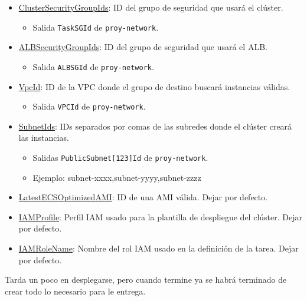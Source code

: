 \begin{itemize}
    \item \underline{ClusterSecurityGroupIds}: ID del grupo de seguridad que usará el clúster.
    \begin{itemize}
        \item Salida \texttt{TaskSGId} de \texttt{proy-network}.
    \end{itemize}

    \item \underline{ALBSecurityGroupIds}: ID del grupo de seguridad que usará el ALB.
    \begin{itemize}
        \item Salida \texttt{ALBSGId} de \texttt{proy-network}.
    \end{itemize}

    \item \underline{VpcId}: ID de la VPC donde el grupo de destino buscará instancias válidas.
    \begin{itemize}
        \item Salida \texttt{VPCId} de \texttt{proy-network}.
    \end{itemize}

    \item \underline{SubnetIds}: IDs separados por comas de las subredes donde el clúster creará las instancias.
    \begin{itemize}
        \item Salidas \texttt{PublicSubnet[123]Id} de \texttt{proy-network}.
        \item Ejemplo: subnet-xxxx,subnet-yyyy,subnet-zzzz
    \end{itemize}

    \item \underline{LatestECSOptimizedAMI}: ID de una AMI válida. Dejar por defecto.

    \item \underline{IAMProfile}: Perfil IAM usado para la plantilla de despliegue del clúster. Dejar por defecto.

    \item \underline{IAMRoleName}: Nombre del rol IAM usado en la definición de la tarea. Dejar por defecto.
\end{itemize}

Tarda un poco en desplegarse, pero cuando termine ya se habrá terminado de crear todo lo necesario para le entrega.
